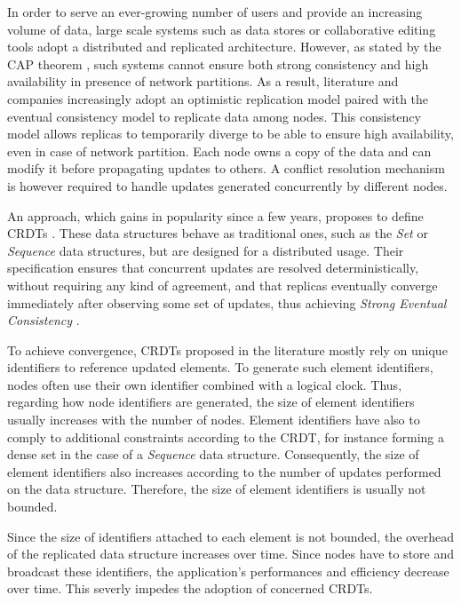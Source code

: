 \documentclass[sigplan]{acmart}
\begin{document}
In order to serve an ever-growing number of users and provide an increasing volume of data,
large scale systems such as data stores or collaborative editing tools adopt a distributed and replicated architecture.
However, as stated by the CAP theorem \cite{brewer_2000_podc}, such systems cannot ensure both strong consistency and high availability in presence of network partitions.
As a result, literature and companies increasingly adopt an optimistic replication model \cite{saito_2005_optimistic-replication} paired with the eventual consistency model to replicate data among nodes.
This consistency model allows replicas to temporarily diverge to be able to ensure high availability, even in case of network partition.
Each node owns a copy of the data and can modify it before propagating updates to others.
A conflict resolution mechanism is however required to handle updates generated concurrently by different nodes.

An approach, which gains in popularity since a few years, proposes to define \acfp{CRDT} \cite{shapiro_2011_crdt}.
These data structures behave as traditional ones, such as the \emph{Set} or \emph{Sequence} data structures, but are designed for a distributed usage.
Their specification ensures that concurrent updates are resolved deterministically, without requiring any kind of agreement, and that replicas eventually converge immediately after observing some set of updates,
thus achieving \emph{Strong Eventual Consistency} \cite{shapiro_2011_crdt}.

To achieve convergence, \acp{CRDT} proposed in the literature mostly rely on unique identifiers to reference updated elements.
To generate such element identifiers, nodes often use their own identifier combined with a logical clock.
Thus, regarding how node identifiers are generated, the size of element identifiers usually increases with the number of nodes.
Element identifiers have also to comply to additional constraints according to the \ac{CRDT}, for instance forming a dense set in the case of a \emph{Sequence} data structure.
Consequently, the size of element identifiers also increases according to the number of updates performed on the data structure.
Therefore, the size of element identifiers is usually not bounded.

Since the size of identifiers attached to each element is not bounded, the overhead of the replicated data structure increases over time.
Since nodes have to store and broadcast these identifiers, the application's performances and efficiency decrease over time.
This severly impedes the adoption of concerned \acp{CRDT}.
\end{document}
